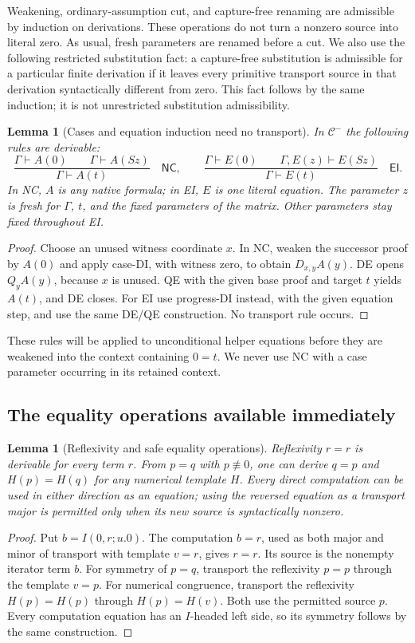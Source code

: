 \documentclass[11pt,a4paper]{article}
\newtheorem{lemma}[theorem]{Lemma}
\theoremstyle{definition}\newtheorem{definition}[theorem]{Definition}
\begin{document}
Weakening, ordinary-assumption cut, and capture-free renaming are
admissible by induction on derivations. These operations do not turn a
nonzero source into literal zero. As usual, fresh parameters are renamed
before a cut. We also use the following restricted substitution fact:
a capture-free substitution is admissible for a particular finite
derivation if it leaves every primitive transport source in that
derivation syntactically different from zero. This fact follows by the
same induction; it is not unrestricted substitution admissibility.

\begin{lemma}[Cases and equation induction need no transport]
\label{zs:cases-induction}
In $\mathcal C^{-}$ the following rules are derivable:
\[
 \frac{\Gamma\vdash A(0)\qquad\Gamma\vdash A(Sz)}
      {\Gamma\vdash A(t)}\quad\mathsf{NC},
 \qquad
 \frac{\Gamma\vdash E(0)\qquad\Gamma,E(z)\vdash E(Sz)}
      {\Gamma\vdash E(t)}\quad\mathsf{EI}.
\]
In NC, $A$ is any native formula; in EI, $E$ is one literal equation.
The parameter $z$ is fresh for $\Gamma$, $t$, and the fixed parameters
of the matrix. Other parameters stay fixed throughout EI.
\end{lemma}
\begin{proof}
Choose an unused witness coordinate $x$. In NC, weaken the successor
proof by $A(0)$ and apply case-DI, with witness zero, to obtain
$D_{x,y}A(y)$. DE opens $Q_yA(y)$, because $x$ is unused. QE with the
given base proof and target $t$ yields $A(t)$, and DE closes.
For EI use progress-DI instead, with the given equation step, and use
the same DE/QE construction. No transport rule occurs.
\end{proof}

These rules will be applied to unconditional helper equations before
they are weakened into the context containing $0=t$. We never use NC
with a case parameter occurring in its retained context.

\subsection{The equality operations available immediately}

\begin{lemma}[Reflexivity and safe equality operations]
\label{zs:safe-equality}
Reflexivity $r=r$ is derivable for every term $r$. From $p=q$ with
$p\not\equiv0$, one can derive $q=p$ and $H(p)=H(q)$ for any numerical
template $H$. Every direct computation can be used in either direction
as an equation; using the reversed equation as a transport major is
permitted only when its new source is syntactically nonzero.
\end{lemma}
\begin{proof}
Put $b=I(0,r;u.0)$. The computation $b=r$, used as both major and
minor of transport with template $v=r$, gives $r=r$. Its source is
the nonempty iterator term $b$.
For symmetry of $p=q$, transport the reflexivity $p=p$ through the
template $v=p$. For numerical congruence, transport the reflexivity
$H(p)=H(p)$ through $H(p)=H(v)$. Both use the permitted source $p$.
Every computation equation has an $I$-headed left side, so its
symmetry follows by the same construction.
\end{proof}
\end{document}
